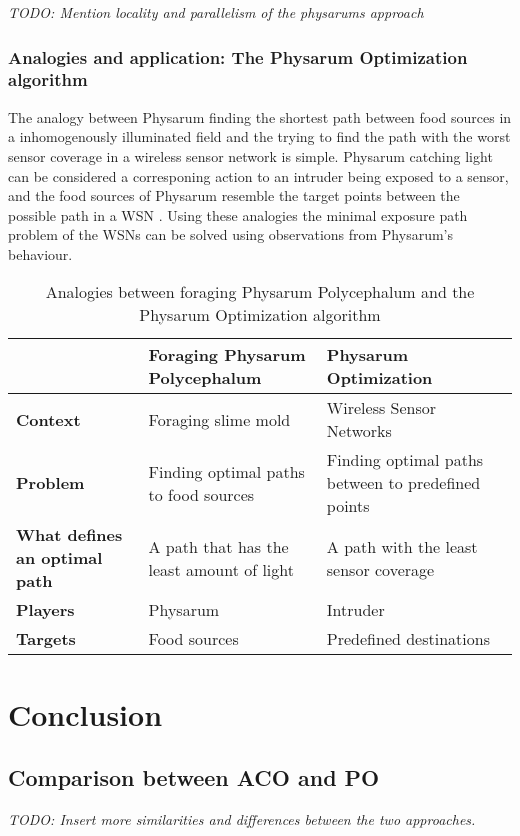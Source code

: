 \documentclass{IWORK2014}
\begin{document}
\textit{TODO: Mention locality and parallelism of the physarums approach}
\subsubsection{Analogies and application: The Physarum Optimization algorithm}
The analogy between Physarum finding the shortest path between food sources in a inhomogenously illuminated field and the trying to find the path with the worst sensor coverage in a wireless sensor network is simple. Physarum catching light can be considered a corresponing action to an intruder being exposed to a sensor, and the food sources of Physarum resemble the target points between the possible path in a WSN \cite{liu2012physarum}. Using these analogies the minimal exposure path problem of the WSNs can be solved using observations from Physarum's behaviour.

\begin{table}
	\begin{tabularx}{\textwidth}{|X|X|X|}
		\hline & \textbf{Foraging Physarum Polycephalum} & \textbf{Physarum Optimization} \\ \hline
		\textbf{Context} & Foraging slime mold & Wireless Sensor Networks \\ \hline
		\textbf{Problem} & Finding optimal paths to food sources & Finding optimal paths between to predefined points \\ \hline
		\textbf{What defines an optimal path} & A path that has the least amount of light & A path with the least sensor coverage \\ \hline
		\textbf{Players} & Physarum & Intruder \\ \hline
		\textbf{Targets} & Food sources & Predefined destinations \\ \hline
	\end{tabularx}
	\caption{Analogies between foraging Physarum Polycephalum and the Physarum Optimization algorithm}
	\label{tbl:analogies_physarum}
\end{table}

\section{Conclusion}

\subsection{Comparison between ACO and PO}
\textit{TODO: Insert more similarities and differences between the two approaches.}
\end{document}
